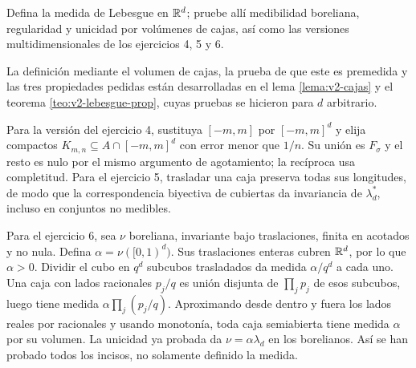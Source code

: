 \begin{ejercicio}\label{ej:v2-l06-10}
Defina la medida de Lebesgue en $\mathbb R^d$; pruebe allí medibilidad boreliana, regularidad y unicidad por volúmenes de cajas, así como las versiones multidimensionales de los ejercicios 4, 5 y 6.
\end{ejercicio}
\begin{solucion}
La definición mediante el volumen de cajas, la prueba de que este es premedida y las tres propiedades pedidas están desarrolladas en el lema \ref{lema:v2-cajas} y el teorema \ref{teo:v2-lebesgue-prop}, cuyas pruebas se hicieron para $d$ arbitrario.

Para la versión del ejercicio 4, sustituya $[-m,m]$ por $[-m,m]^d$ y elija compactos $K_{m,n}\subseteq A\cap[-m,m]^d$ con error menor que $1/n$. Su unión es $F_\sigma$ y el resto es nulo por el mismo argumento de agotamiento; la recíproca usa completitud. Para el ejercicio 5, trasladar una caja preserva todas sus longitudes, de modo que la correspondencia biyectiva de cubiertas da invariancia de $\lambda_d^*$, incluso en conjuntos no medibles.

Para el ejercicio 6, sea $\nu$ boreliana, invariante bajo traslaciones, finita en acotados y no nula. Defina $\alpha=\nu([0,1)^d)$. Sus traslaciones enteras cubren $\mathbb R^d$, por lo que $\alpha>0$. Dividir el cubo en $q^d$ subcubos trasladados da medida $\alpha/q^d$ a cada uno. Una caja con lados racionales $p_j/q$ es unión disjunta de $\prod_jp_j$ de esos subcubos, luego tiene medida $\alpha\prod_j(p_j/q)$. Aproximando desde dentro y fuera los lados reales por racionales y usando monotonía, toda caja semiabierta tiene medida $\alpha$ por su volumen. La unicidad ya probada da $\nu=\alpha\lambda_d$ en los borelianos. Así se han probado todos los incisos, no solamente definido la medida.
\end{solucion}

